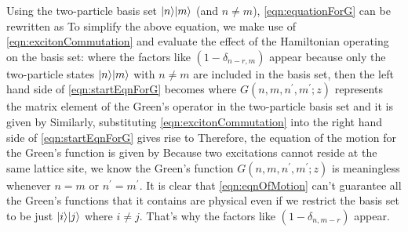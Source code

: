 Using the two-particle basis set $| n \rangle| m \rangle$ (and $n \neq m$), \autoref{eqn:equationForG} can be rewritten as
To simplify the above equation, we make use of \autoref{eqn:excitonCommutation} and evaluate the effect of the 
Hamiltonian operating on the basis set:
where the factors like $(1-\delta_{n-r, m})$ appear because only the two-particle states $| n \rangle| m \rangle$ with 
$n \neq m$ are included in the basis set, 
then the left hand side of \autoref{eqn:startEqnForG} becomes
where $G(n, m, n^{\prime}, m^{\prime}; z)$ represents the matrix element of the Green's operator in the two-particle 
basis set and it is given by
Similarly, substituting \autoref{eqn:excitonCommutation} into the right hand side of \autoref{eqn:startEqnForG}  gives
rise to 
Therefore, the equation of the motion for the Green's function is given by
Because two excitations cannot reside at the same lattice site, we know the Green's function 
$G(n, m, n^{\prime}, m^{\prime}; z)$ is meaningless whenever $n=m$ or $n^{\prime} = m^{\prime}$. It is clear that
\autoref{eqn:eqnOfMotion} can't guarantee all the Green's functions that it contains are physical even if we restrict
the basis set to be just $| i \rangle| j \rangle$ where $i \neq j$. That's why the factors like  $(1-\delta_{n, m-r})$ appear. 

